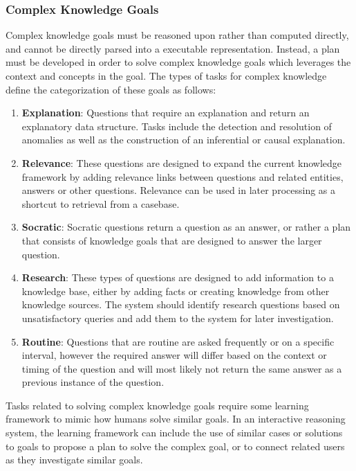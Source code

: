 \documentclass[11pt,letterpaper]{article}
\begin{document}
\subsubsection{Complex Knowledge Goals}

Complex knowledge goals must be reasoned upon rather than computed directly, and cannot be directly parsed into a executable representation. Instead, a plan must be developed in order to solve complex knowledge goals which leverages the context and concepts in the goal. The types of tasks for complex knowledge define the categorization of these goals as follows:

\begin{enumerate}

\item \textbf{Explanation}: Questions that require an explanation and return an explanatory data structure. Tasks include the detection and resolution of anomalies as well as the construction of an inferential or causal explanation.

\item \textbf{Relevance}: These questions are designed to expand the current knowledge framework by adding relevance links between questions and related entities, answers or other questions. Relevance can be used in later processing as a shortcut to retrieval from a casebase.

\item \textbf{Socratic}: Socratic questions return a question as an answer, or rather a plan that consists of knowledge goals that are designed to answer the larger question.

\item \textbf{Research}: These types of questions are designed to add information to a knowledge base, either by adding facts or creating knowledge from other knowledge sources. The system should identify research questions based on unsatisfactory queries and add them to the system for later investigation.

\item \textbf{Routine}: Questions that are routine are asked frequently or on a specific interval, however the required answer will differ based on the context or timing of the question and will most likely not return the same answer as a previous instance of the question.

\end{enumerate}

Tasks related to solving complex knowledge goals require some learning framework to mimic how humans solve similar goals. In an interactive reasoning system, the learning framework can include the use of similar cases or solutions to goals to propose a plan to solve the complex goal, or to connect related users as they investigate similar goals.
\end{document}

